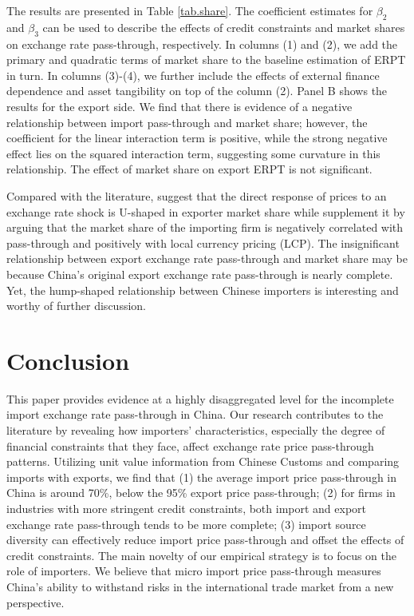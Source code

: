 \documentclass[12pt]{article}
\begin{document}
The results are presented in Table \ref{tab.share}. The coefficient estimates for $\beta_2$ and $\beta_3$ can be used to describe the effects of credit constraints and market shares on exchange rate pass-through, respectively. In columns (1) and (2), we add the primary and quadratic terms of market share to the baseline estimation of ERPT in turn. In columns (3)-(4), we further include the effects of external finance dependence and asset tangibility on top of the column (2). Panel B shows the results for the export side. We find that there is evidence of a negative relationship between import pass-through and market share; however, the coefficient for the linear interaction term is positive, while the strong negative effect lies on the squared interaction term, suggesting some curvature in this relationship. The effect of market share on export ERPT is not significant. 

Compared with the literature, \cite{auer2016} suggest that the direct response of prices to an exchange rate shock is U-shaped in exporter market share while \cite{devereux2017} supplement it by arguing that the market share of the importing firm is negatively correlated with pass-through and positively with local currency pricing (LCP). The insignificant relationship between export exchange rate pass-through and market share may be because China's original export exchange rate pass-through is nearly complete. Yet, the hump-shaped relationship between Chinese importers is interesting and worthy of further discussion.

\section{Conclusion}\label{Conclusion}

This paper provides evidence at a highly disaggregated level for the incomplete import exchange rate pass-through in China. Our research contributes to the literature by revealing how importers' characteristics, especially the degree of financial constraints that they face, affect exchange rate price pass-through patterns. Utilizing unit value information from Chinese Customs and comparing imports with exports, we find that (1) the average import price pass-through in China is around 70\%, below the 95\% export price pass-through; (2) for firms in industries with more stringent credit constraints, both import and export exchange rate pass-through tends to be more complete; (3) import source diversity can effectively reduce import price pass-through and offset the effects of credit constraints. The main novelty of our empirical strategy is to focus on the role of importers. We believe that micro import price pass-through measures China's ability to withstand risks in the international trade market from a new perspective.
\end{document}
